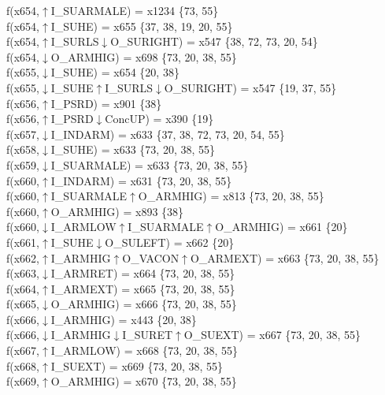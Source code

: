 f(x654,$\uparrow$I\_SUARMALE) = x1234 \{73, 55\} \\  
f(x654,$\uparrow$I\_SUHE) = x655 \{37, 38, 19, 20, 55\} \\  
f(x654,$\uparrow$I\_SURLS$\downarrow$O\_SURIGHT) = x547 \{38, 72, 73, 20, 54\} \\  
f(x654,$\downarrow$O\_ARMHIG) = x698 \{73, 20, 38, 55\} \\  
f(x655,$\downarrow$I\_SUHE) = x654 \{20, 38\} \\  
f(x655,$\downarrow$I\_SUHE$\uparrow$I\_SURLS$\downarrow$O\_SURIGHT) = x547 \{19, 37, 55\} \\  
f(x656,$\uparrow$I\_PSRD) = x901 \{38\} \\  
f(x656,$\uparrow$I\_PSRD$\downarrow$ConcUP) = x390 \{19\} \\  
f(x657,$\downarrow$I\_INDARM) = x633 \{37, 38, 72, 73, 20, 54, 55\} \\  
f(x658,$\downarrow$I\_SUHE) = x633 \{73, 20, 38, 55\} \\  
f(x659,$\downarrow$I\_SUARMALE) = x633 \{73, 20, 38, 55\} \\  
f(x660,$\uparrow$I\_INDARM) = x631 \{73, 20, 38, 55\} \\  
f(x660,$\uparrow$I\_SUARMALE$\uparrow$O\_ARMHIG) = x813 \{73, 20, 38, 55\} \\  
f(x660,$\uparrow$O\_ARMHIG) = x893 \{38\} \\  
f(x660,$\downarrow$I\_ARMLOW$\uparrow$I\_SUARMALE$\uparrow$O\_ARMHIG) = x661 \{20\} \\  
f(x661,$\uparrow$I\_SUHE$\downarrow$O\_SULEFT) = x662 \{20\} \\  
f(x662,$\uparrow$I\_ARMHIG$\uparrow$O\_VACON$\uparrow$O\_ARMEXT) = x663 \{73, 20, 38, 55\} \\  
f(x663,$\downarrow$I\_ARMRET) = x664 \{73, 20, 38, 55\} \\  
f(x664,$\uparrow$I\_ARMEXT) = x665 \{73, 20, 38, 55\} \\  
f(x665,$\downarrow$O\_ARMHIG) = x666 \{73, 20, 38, 55\} \\  
f(x666,$\downarrow$I\_ARMHIG) = x443 \{20, 38\} \\  
f(x666,$\downarrow$I\_ARMHIG$\downarrow$I\_SURET$\uparrow$O\_SUEXT) = x667 \{73, 20, 38, 55\} \\  
f(x667,$\uparrow$I\_ARMLOW) = x668 \{73, 20, 38, 55\} \\  
f(x668,$\uparrow$I\_SUEXT) = x669 \{73, 20, 38, 55\} \\  
f(x669,$\uparrow$O\_ARMHIG) = x670 \{73, 20, 38, 55\} \\  
